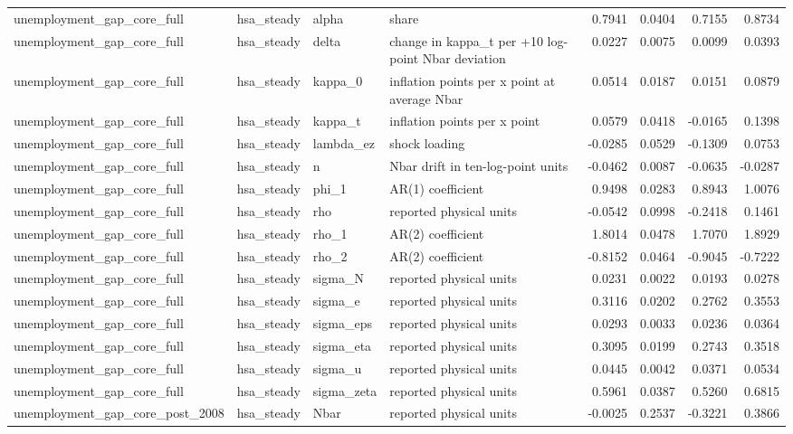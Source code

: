 \begin{tabular}{llllrrrr}
unemployment\_gap\_core\_full & hsa\_steady & alpha & share & 0.7941 & 0.0404 & 0.7155 & 0.8734 \\
unemployment\_gap\_core\_full & hsa\_steady & delta & change in kappa\_t per +10 log-point Nbar deviation & 0.0227 & 0.0075 & 0.0099 & 0.0393 \\
unemployment\_gap\_core\_full & hsa\_steady & kappa\_0 & inflation points per x point at average Nbar & 0.0514 & 0.0187 & 0.0151 & 0.0879 \\
unemployment\_gap\_core\_full & hsa\_steady & kappa\_t & inflation points per x point & 0.0579 & 0.0418 & -0.0165 & 0.1398 \\
unemployment\_gap\_core\_full & hsa\_steady & lambda\_ez & shock loading & -0.0285 & 0.0529 & -0.1309 & 0.0753 \\
unemployment\_gap\_core\_full & hsa\_steady & n & Nbar drift in ten-log-point units & -0.0462 & 0.0087 & -0.0635 & -0.0287 \\
unemployment\_gap\_core\_full & hsa\_steady & phi\_1 & AR(1) coefficient & 0.9498 & 0.0283 & 0.8943 & 1.0076 \\
unemployment\_gap\_core\_full & hsa\_steady & rho & reported physical units & -0.0542 & 0.0998 & -0.2418 & 0.1461 \\
unemployment\_gap\_core\_full & hsa\_steady & rho\_1 & AR(2) coefficient & 1.8014 & 0.0478 & 1.7070 & 1.8929 \\
unemployment\_gap\_core\_full & hsa\_steady & rho\_2 & AR(2) coefficient & -0.8152 & 0.0464 & -0.9045 & -0.7222 \\
unemployment\_gap\_core\_full & hsa\_steady & sigma\_N & reported physical units & 0.0231 & 0.0022 & 0.0193 & 0.0278 \\
unemployment\_gap\_core\_full & hsa\_steady & sigma\_e & reported physical units & 0.3116 & 0.0202 & 0.2762 & 0.3553 \\
unemployment\_gap\_core\_full & hsa\_steady & sigma\_eps & reported physical units & 0.0293 & 0.0033 & 0.0236 & 0.0364 \\
unemployment\_gap\_core\_full & hsa\_steady & sigma\_eta & reported physical units & 0.3095 & 0.0199 & 0.2743 & 0.3518 \\
unemployment\_gap\_core\_full & hsa\_steady & sigma\_u & reported physical units & 0.0445 & 0.0042 & 0.0371 & 0.0534 \\
unemployment\_gap\_core\_full & hsa\_steady & sigma\_zeta & reported physical units & 0.5961 & 0.0387 & 0.5260 & 0.6815 \\
unemployment\_gap\_core\_post\_2008 & hsa\_steady & Nbar & reported physical units & -0.0025 & 0.2537 & -0.3221 & 0.3866 \\

\end{tabular}
